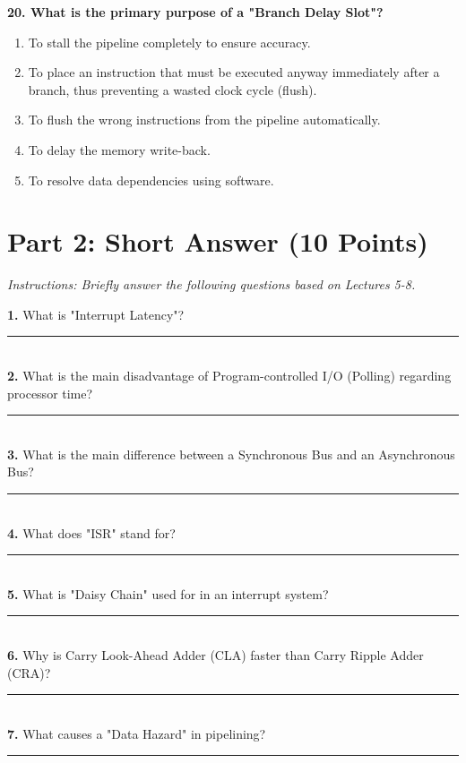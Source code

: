 \documentclass[12pt]{article}
\begin{document}
\textbf{20. What is the primary purpose of a "Branch Delay Slot"?}
\begin{enumerate}[label=\Alph*.]
    \item To stall the pipeline completely to ensure accuracy.
    \item To place an instruction that must be executed anyway immediately after a branch, thus preventing a wasted clock cycle (flush).
    \item To flush the wrong instructions from the pipeline automatically.
    \item To delay the memory write-back.
    \item To resolve data dependencies using software.
\end{enumerate}

\newpage
\section*{Part 2: Short Answer (10 Points)}
\textit{Instructions: Briefly answer the following questions based on Lectures 5-8.}

\textbf{1.} What is "Interrupt Latency"? \\
\rule{\textwidth}{0.4pt} \\

\textbf{2.} What is the main disadvantage of Program-controlled I/O (Polling) regarding processor time? \\
\rule{\textwidth}{0.4pt} \\

\textbf{3.} What is the main difference between a Synchronous Bus and an Asynchronous Bus? \\
\rule{\textwidth}{0.4pt} \\

\textbf{4.} What does "ISR" stand for? \\
\rule{\textwidth}{0.4pt} \\

\textbf{5.} What is "Daisy Chain" used for in an interrupt system? \\
\rule{\textwidth}{0.4pt} \\

\textbf{6.} Why is Carry Look-Ahead Adder (CLA) faster than Carry Ripple Adder (CRA)? \\
\rule{\textwidth}{0.4pt} \\

\textbf{7.} What causes a "Data Hazard" in pipelining? \\
\rule{\textwidth}{0.4pt} \\
\end{document}
